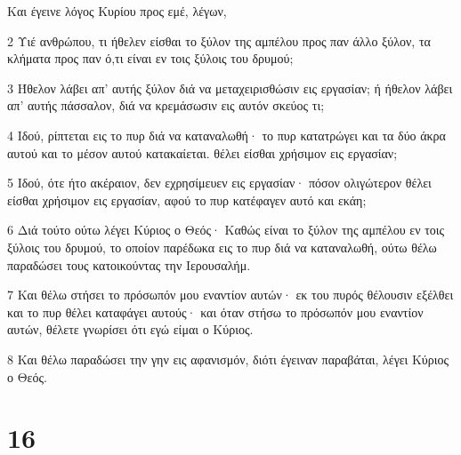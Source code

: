 \par Και έγεινε λόγος Κυρίου προς εμέ, λέγων,
\par 2 Υιέ ανθρώπου, τι ήθελεν είσθαι το ξύλον της αμπέλου προς παν άλλο ξύλον, τα κλήματα προς παν ό,τι είναι εν τοις ξύλοις του δρυμού;
\par 3 Ήθελον λάβει απ' αυτής ξύλον διά να μεταχειρισθώσιν εις εργασίαν; ή ήθελον λάβει απ' αυτής πάσσαλον, διά να κρεμάσωσιν εις αυτόν σκεύος τι;
\par 4 Ιδού, ρίπτεται εις το πυρ διά να καταναλωθή· το πυρ κατατρώγει και τα δύο άκρα αυτού και το μέσον αυτού κατακαίεται. θέλει είσθαι χρήσιμον εις εργασίαν;
\par 5 Ιδού, ότε ήτο ακέραιον, δεν εχρησίμευεν εις εργασίαν· πόσον ολιγώτερον θέλει είσθαι χρήσιμον εις εργασίαν, αφού το πυρ κατέφαγεν αυτό και εκάη;
\par 6 Διά τούτο ούτω λέγει Κύριος ο Θεός· Καθώς είναι το ξύλον της αμπέλου εν τοις ξύλοις του δρυμού, το οποίον παρέδωκα εις το πυρ διά να καταναλωθή, ούτω θέλω παραδώσει τους κατοικούντας την Ιερουσαλήμ.
\par 7 Και θέλω στήσει το πρόσωπόν μου εναντίον αυτών· εκ του πυρός θέλουσιν εξέλθει και το πυρ θέλει καταφάγει αυτούς· και όταν στήσω το πρόσωπόν μου εναντίον αυτών, θέλετε γνωρίσει ότι εγώ είμαι ο Κύριος.
\par 8 Και θέλω παραδώσει την γην εις αφανισμόν, διότι έγειναν παραβάται, λέγει Κύριος ο Θεός.

\chapter{16}

